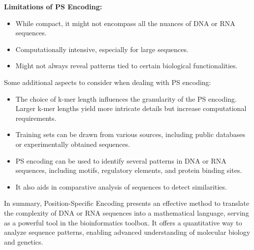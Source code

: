 \noindent
\textbf{Limitations of PS Encoding:}
\begin{itemize}
  \item While compact, it might not encompass all the nuances of DNA or RNA sequences.
  \item Computationally intensive, especially for large sequences.
  \item Might not always reveal patterns tied to certain biological functionalities.
\end{itemize}

\noindent
Some additional aspects to consider when dealing with PS encoding:

\begin{itemize}
  \item The choice of k-mer length influences the granularity of the PS encoding. Larger k-mer lengths yield more intricate details but increase computational requirements.
  
  \item Training sets can be drawn from various sources, including public databases or experimentally obtained sequences.
  
  \item PS encoding can be used to identify several patterns in DNA or RNA sequences, including motifs, regulatory elements, and protein binding sites.
  
  \item It also aids in comparative analysis of sequences to detect similarities.
\end{itemize}

\noindent
In summary, Position-Specific Encoding presents an effective method to translate the complexity of DNA or RNA sequences into a mathematical language, serving as a powerful tool in the bioinformatics toolbox. It offers a quantitative way to analyze sequence patterns, enabling advanced understanding of molecular biology and genetics.